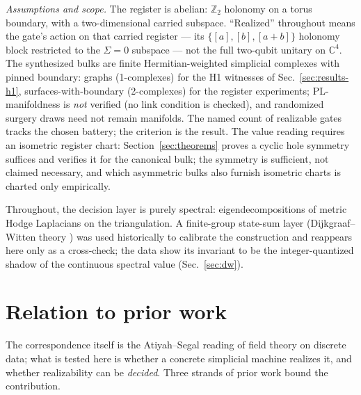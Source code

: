 \documentclass[a4paper,twocolumn,11pt,unpublished]{quantumarticle}
\theoremstyle{plain}
\theoremstyle{remark}
\begin{document}
\emph{Assumptions and scope.} The register is abelian: $\mathbb{Z}_2$
holonomy on a torus boundary, with a two-dimensional carried subspace.
``Realized'' throughout means the gate's action on that carried register
--- its $\{[a],[b],[a{+}b]\}$ holonomy block restricted to the $\Sigma=0$
subspace --- not the full two-qubit unitary on $\mathbb{C}^4$. The
synthesized bulks are finite Hermitian-weighted simplicial complexes with
pinned boundary: graphs (1-complexes) for the H1 witnesses of
Sec.~\ref{sec:results-h1}, surfaces-with-boundary (2-complexes) for the
register experiments; PL-manifoldness is \emph{not} verified (no link
condition is checked), and randomized surgery draws need not remain
manifolds. The named count of realizable gates tracks the chosen battery;
the criterion is the result. The value reading requires an isometric
register chart: Section~\ref{sec:theorems} proves a cyclic hole symmetry
suffices and verifies it for the canonical bulk; the symmetry is
sufficient, not claimed necessary, and which asymmetric bulks also
furnish isometric charts is charted only empirically.

Throughout, the decision layer is purely spectral: eigendecompositions of
metric Hodge Laplacians on the triangulation. A finite-group state-sum
layer (Dijkgraaf--Witten theory \cite{DijkgraafWitten1990Topological}) was
used historically to calibrate the construction and reappears here only as
a cross-check; the data show its invariant to be the integer-quantized
shadow of the continuous spectral value (Sec.~\ref{sec:dw}).

\section{Relation to prior work}
\label{sec:related}

The correspondence itself is the Atiyah--Segal reading of field theory
\cite{Atiyah1988TQFT,Segal2004Definition} on discrete data; what is
tested here is whether a concrete simplicial machine realizes it, and
whether realizability can be \emph{decided}. Three strands of prior work
bound the contribution.
\end{document}
